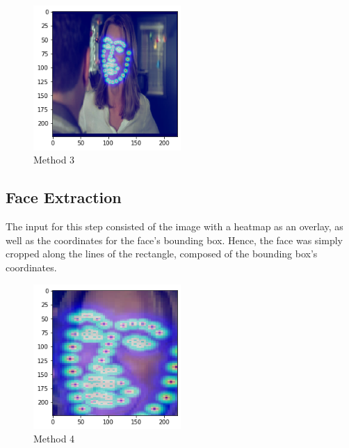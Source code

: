 \begin{center}
\begin{figure}[H]
  \begin{center}
  \includegraphics[angle=0, width=0.5\textwidth]{Figures/method_3.png}
  \caption{Method 3}
  \label{fig:MachineLearningModelMethod_3}
  \end{center}
\end{figure}
\end{center}

\subsection{Face Extraction}
The input for this step consisted of the image with a heatmap as an overlay, as well as the coordinates for the face's bounding box. Hence, the face was simply cropped along the lines of the rectangle, composed of the bounding box's coordinates. %

\begin{center}
\begin{figure}[H]
  \begin{center}
  \includegraphics[angle=0, width=0.5\textwidth]{Figures/method_4.png}
  \caption{Method 4}
  \label{fig:MachineLearningModelMethod_4}
  \end{center}
\end{figure}
\end{center}

